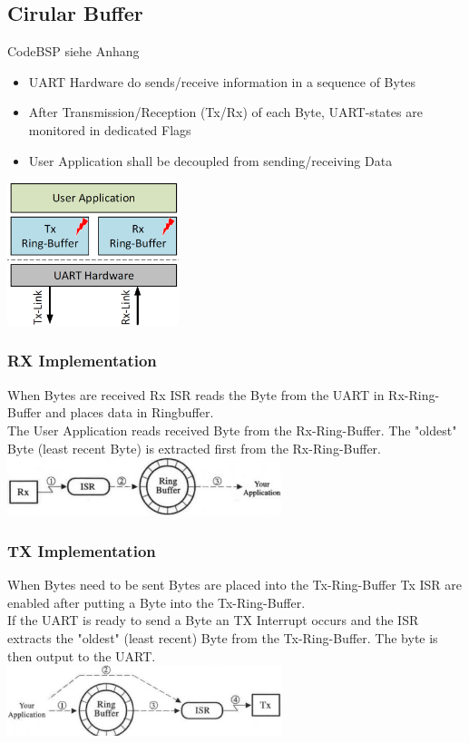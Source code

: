 \begin{minipage}{12cm}
    \subsection{Cirular Buffer}
    CodeBSP siehe Anhang \label{CircularBuffer}
	\begin{itemize}
		\item UART Hardware do sends/receive information in a sequence of Bytes
		\item After Transmission/Reception (Tx/Rx) of each Byte, UART-states are monitored in dedicated Flags
		\item User Application shall be decoupled from sending/receiving Data
	\end{itemize}
\end{minipage}
\begin{minipage}{5cm}
	\includegraphics[width=5cm]{images/ringbuffer.png}
\end{minipage}
\begin{multicols}{2}
\subsubsection{RX Implementation}
When Bytes are received Rx \acs{ISR} reads the Byte from the \acs{UART} in Rx-Ring-Buffer and places data in Ringbuffer. \\
The User Application reads received Byte from the Rx-Ring-Buffer. The "oldest" Byte (least recent Byte) is extracted first from the Rx-Ring-Buffer.\\
\includegraphics[width=8cm]{images/rx_buffer.png}
\subsubsection{TX Implementation}
When Bytes need to be sent Bytes are placed into the Tx-Ring-Buffer Tx \acs{ISR} are enabled after putting a Byte into the Tx-Ring-Buffer. \\
If the UART is ready to send a Byte an TX Interrupt occurs and the ISR extracts the "oldest" (least recent) Byte from the Tx-Ring-Buffer. The byte is then output to the UART.\\
\includegraphics[width=8cm]{images/tx_buffer.png}
\end{multicols}
\clearpage

